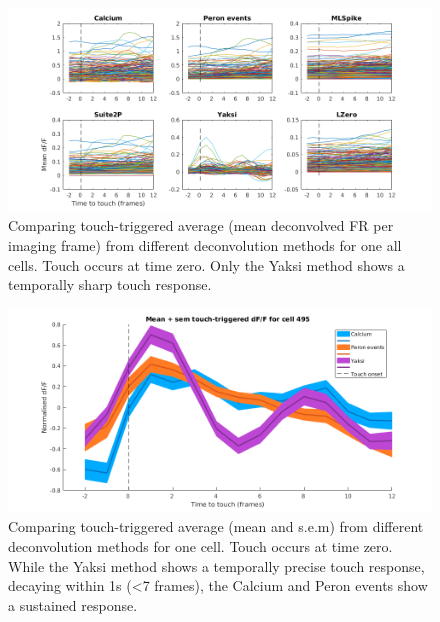 \documentclass[a4paper]{article}
\begin{document}
\begin{figure}[h]
\centering
\includegraphics[width=1\textwidth]{tth_all.png}
\caption{\label{fig:tth_all} Comparing touch-triggered average (mean deconvolved FR per imaging frame) from different deconvolution methods for one all cells. Touch occurs at time zero. Only the Yaksi method shows a temporally sharp touch response.}
\end{figure}

\begin{figure}[h]
\centering
\includegraphics[width=1\textwidth]{tth_495.png}
\caption{\label{fig:tth_495}Comparing touch-triggered average (mean and s.e.m) from different deconvolution methods for one cell. Touch occurs at time zero. While the Yaksi method shows a temporally precise touch response, decaying within 1s (<7 frames), the Calcium and Peron events show a sustained response.}
\end{figure}
\end{document}
